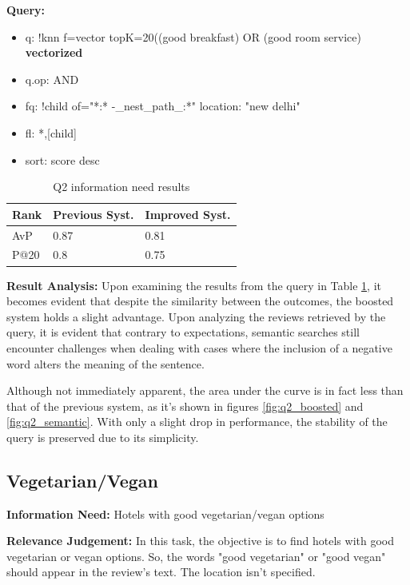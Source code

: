 \documentclass[sigconf]{acmart}
\begin{document}
\textbf{Query:}

\begin{itemize}
    \item q: {!knn f=vector topK=20}((good breakfast) OR (good room service) \textbf{vectorized}
    \item q.op: AND
    \item fq: {!child of="*:* -\_nest\_path\_:*"} location: "new delhi"
    \item fl: *,[child]
    \item sort: score desc
\end{itemize}

\begin{table}[H]
\caption{Q2 information need results}
\label{tab:q8}
\begin{tabular}{lll}
\toprule
Rank & Previous Syst. & Improved Syst.\\
\midrule
AvP & 0.87 & 0.81  \\
P@20 & 0.8 & 0.75 \\
\bottomrule
\end{tabular}
\end{table}

\textbf{Result Analysis:} Upon examining the results from the query in Table \ref{tab:q8}, it becomes evident that despite the similarity between the outcomes, the boosted system holds a slight advantage.
Upon analyzing the reviews retrieved by the query, it is evident that contrary to expectations, semantic searches still encounter challenges when dealing with cases where the inclusion of a negative word alters the meaning of the sentence.

Although not immediately apparent, the area under the curve is in fact less than that of the previous system, as it's shown in figures \ref{fig:q2_boosted} and \ref{fig:q2_semantic}. With only a slight drop in performance, the stability of the query is preserved due to its simplicity.

\subsection{Vegetarian/Vegan}

\textbf{Information Need:} Hotels with good vegetarian/vegan options

\textbf{Relevance Judgement:} In this task, the objective is to find hotels with good vegetarian or vegan options. So, the words "good vegetarian" or "good vegan" should appear in the review's text. The location isn't specified.
\end{document}
